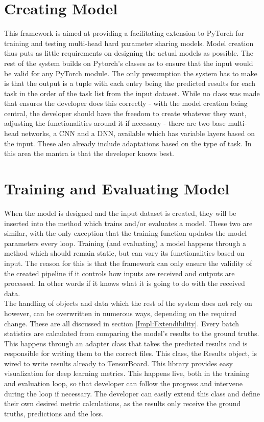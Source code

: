 \section{Creating Model} \label{Design:Model}
This framework is aimed at providing a facilitating extension to PyTorch for training and testing multi-head hard parameter sharing models. Model creation thus puts as little requirements on designing the actual models as possible. The rest of the system builds on Pytorch's classes as to ensure that the input would be valid for any PyTorch module. The only presumption the system has to make is that the output is a tuple with each entry being the predicted results for each task in the order of the task list from the input dataset. While no class was made that ensures the developer does this correctly - with the model creation being central, the developer should have the freedom to create whatever they want, adjusting the functionalities around it if necessary - there are two base multi-head networks, a CNN and a DNN, available which has variable layers based on the input. These also already include adaptations based on the type of task. In this area the mantra is that the developer knows best. \\


\section{Training and Evaluating Model} \label{Design:Training}

When the model is designed and the input dataset is created, they will be inserted into the method which trains and/or evaluates a model. These two are similar, with the only exception that the training function updates the model parameters every loop. Training (and evaluating) a model happens through a method which should remain static, but can vary its functionalities based on input. The reason for this is that the framework can only ensure the validity of the created pipeline if it controls how inputs are received and outputs are processed. In other words if it knows what it is going to do with the received data. \\

The handling of objects and data which the rest of the system does not rely on however, can be overwritten in numerous ways, depending on the required change. These are all discussed in section \ref{Impl:Extendibility}. Every batch statistics are calculated from comparing the model's results to the ground truths. This happens through an adapter class that takes the predicted results and is responsible for writing them to the correct files. This class, the Results object, is wired to write results already to TensorBoard. This library provides easy visualization for deep learning metrics. This happens live, both in the training and evaluation loop, so that developer can follow the progress and intervene during the loop if necessary. The developer can easily extend this class and define their own desired metric calculations, as the results only receive the ground truths, predictions and the loss. \\

